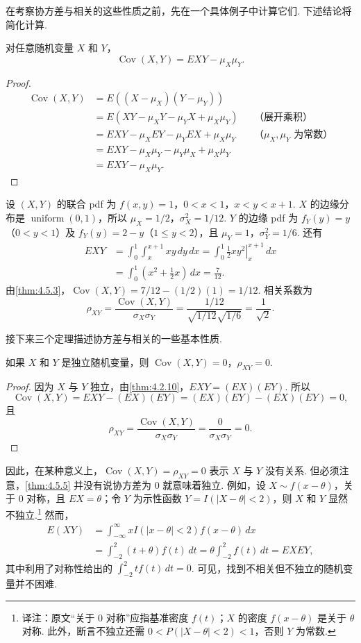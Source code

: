 在考察协方差与相关的这些性质之前，先在一个具体例子中计算它们. 下述结论将简化计算.
\begin{theorem}\label{thm:4.5.3}
对任意随机变量 $X$ 和 $Y$，
$$\operatorname{Cov}(X,Y)=EXY-\mu_X\mu_Y.$$
\end{theorem}
\begin{proof}
$$\begin{aligned}
\operatorname{Cov}(X,Y)&=E((X-\mu_X)(Y-\mu_Y))\\
&=E(XY-\mu_XY-\mu_YX+\mu_X\mu_Y)&&\text{（展开乘积）}\\
&=EXY-\mu_XEY-\mu_YEX+\mu_X\mu_Y&&\text{（$\mu_X,\mu_Y$ 为常数）}\\
&=EXY-\mu_X\mu_Y-\mu_Y\mu_X+\mu_X\mu_Y\\
&=EXY-\mu_X\mu_Y.
\end{aligned}$$
\end{proof}
\begin{example}[相关——I]\label{ex:4.5.4}
设 $(X,Y)$ 的联合 pdf 为 $f(x,y)=1$，$0<x<1$，$x<y<x+1$. $X$ 的边缘分布是 $\operatorname{uniform}(0,1)$，所以 $\mu_X=1/2$，$\sigma_X^2=1/12$. $Y$ 的边缘 pdf 为 $f_Y(y)=y$（$0<y<1$）及 $f_Y(y)=2-y$（$1\le y<2$），且 $\mu_Y=1$，$\sigma_Y^2=1/6$. 还有
$$\begin{aligned}
EXY&=\int_0^1\int_x^{x+1}xy\,dy\,dx=\int_0^1\left.\frac12xy^2\right|_x^{x+1}\,dx\\
&=\int_0^1\left(x^2+\frac12x\right)\,dx=\frac7{12}.
\end{aligned}$$
由\autoref{thm:4.5.3}，$\operatorname{Cov}(X,Y)=7/12-(1/2)(1)=1/12$. 相关系数为
$$\rho_{XY}=\frac{\operatorname{Cov}(X,Y)}{\sigma_X\sigma_Y}=\frac{1/12}{\sqrt{1/12}\sqrt{1/6}}=\frac1{\sqrt2}.$$
\end{example}
接下来三个定理描述协方差与相关的一些基本性质.

\begin{theorem}\label{thm:4.5.5}
如果 $X$ 和 $Y$ 是独立随机变量，则 $\operatorname{Cov}(X,Y)=0$，$\rho_{XY}=0$.
\end{theorem}
\begin{proof}
因为 $X$ 与 $Y$ 独立，由\autoref{thm:4.2.10}，$EXY=(EX)(EY)$. 所以
$$\operatorname{Cov}(X,Y)=EXY-(EX)(EY)=(EX)(EY)-(EX)(EY)=0,$$
且
$$\rho_{XY}=\frac{\operatorname{Cov}(X,Y)}{\sigma_X\sigma_Y}=\frac0{\sigma_X\sigma_Y}=0.$$
\end{proof}
因此，在某种意义上，$\operatorname{Cov}(X,Y)=\rho_{XY}=0$ 表示 $X$ 与 $Y$ 没有关系. 但必须注意，\autoref{thm:4.5.5} 并没有说协方差为 0 就意味着独立. 例如，设 $X\sim f(x-\theta)$，关于 0 对称，且 $EX=\theta$；令 $Y$ 为示性函数 $Y=I(|X-\theta|<2)$，则 $X$ 和 $Y$ 显然不独立.\footnote{译注：原文“关于 0 对称”应指基准密度 $f(t)$；$X$ 的密度 $f(x-\theta)$ 是关于 $\theta$ 对称. 此外，断言不独立还需 $0<P(|X-\theta|<2)<1$，否则 $Y$ 为常数.} 然而，
$$\begin{aligned}
E(XY)&=\int_{-\infty}^{\infty}xI(|x-\theta|<2)f(x-\theta)\,dx\\
&=\int_{-2}^2(t+\theta)f(t)\,dt=\theta\int_{-2}^2f(t)\,dt=EXEY,
\end{aligned}$$
其中利用了对称性给出的 $\int_{-2}^2tf(t)\,dt=0$. 可见，找到不相关但不独立的随机变量并不困难.

